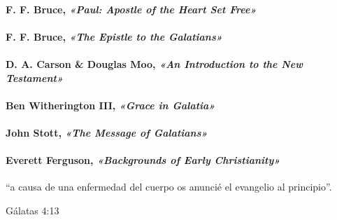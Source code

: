 \documentclass[11a pt,twoside]{article}
\newcommand{\scripture}[1]{%
  {\fontsize{12pt}{16pt}\selectfont\ScriptureFont\itshape #1}%
}
\let\oldparagraph\paragraph
\renewcommand{\paragraph}{\needspace{3\baselineskip}\oldparagraph}
\begin{document}
\paragraph{\texorpdfstring{F. F. Bruce,
\scripture{«Paul: Apostle of the Heart Set Free»}}{F. F. Bruce, }}\label{f.-f.-bruce-paul-apostle-of-the-heart-set-free}

\paragraph{\texorpdfstring{F. F. Bruce,
\scripture{«The Epistle to the Galatians»}}{F. F. Bruce, }}\label{f.-f.-bruce-the-epistle-to-the-galatians}

\paragraph{\texorpdfstring{D. A. Carson \& Douglas Moo,
\scripture{«An Introduction to the New Testament»}}{D. A. Carson \& Douglas Moo, }}\label{d.-a.-carson-douglas-moo-an-introduction-to-the-new-testament}

\paragraph{\texorpdfstring{Ben Witherington III,
\scripture{«Grace in Galatia»}}{Ben Witherington III, }}\label{ben-witherington-iii-grace-in-galatia}

\paragraph{\texorpdfstring{John Stott,
\scripture{«The Message of Galatians»}}{John Stott, }}\label{john-stott-the-message-of-galatians}

\paragraph{\texorpdfstring{Everett Ferguson,
\scripture{«Backgrounds of Early Christianity»}}{Everett Ferguson, }}\label{everett-ferguson-backgrounds-of-early-christianity}

``a causa de una enfermedad del cuerpo os anuncié el evangelio al
principio''.

Gálatas 4:13
\end{document}

